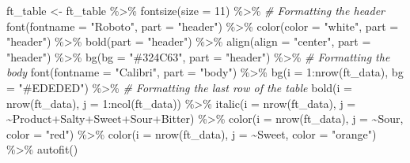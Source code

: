 \documentclass[
]{krantz}
\makeatletter
\newenvironment{Shaded}{\begin{snugshade}}{\end{snugshade}}
\newcommand{\AttributeTok}[1]{\textcolor[rgb]{0.61,0.61,0.61}{#1}}
\newcommand{\CommentTok}[1]{\textcolor[rgb]{0.37,0.37,0.37}{\textit{#1}}}
\newcommand{\DecValTok}[1]{\textcolor[rgb]{0.06,0.06,0.06}{#1}}
\newcommand{\FunctionTok}[1]{\textcolor[rgb]{0,0,0}{#1}}
\newcommand{\NormalTok}[1]{#1}
\newcommand{\OtherTok}[1]{\textcolor[rgb]{0.37,0.37,0.37}{#1}}
\newcommand{\SpecialCharTok}[1]{\textcolor[rgb]{0,0,0}{#1}}
\newcommand{\StringTok}[1]{\textcolor[rgb]{0.5,0.5,0.5}{#1}}
\newenvironment{kframe}{%
\medskip{}
\setlength{\fboxsep}{.8em}
 \def\at@end@of@kframe{}%
 \ifinner\ifhmode%
  \def\at@end@of@kframe{\end{minipage}}%
  \begin{minipage}{\columnwidth}%
 \fi\fi%
 \def\FrameCommand##1{\hskip\@totalleftmargin \hskip-\fboxsep
 \colorbox{shadecolor}{##1}\hskip-\fboxsep
     \hskip-\linewidth \hskip-\@totalleftmargin \hskip\columnwidth}%
 \MakeFramed {\advance\hsize-\width
   \@totalleftmargin\z@ \linewidth\hsize
   \@setminipage}}%
 {\par\unskip\endMakeFramed%
 \at@end@of@kframe}
\renewenvironment{Shaded}{\begin{kframe}}{\end{kframe}}
\makeatother
\begin{document}
\begin{Shaded}
\begin{Highlighting}[]
\NormalTok{ft\_table }\OtherTok{\textless{}{-}}\NormalTok{ ft\_table }\SpecialCharTok{\%\textgreater{}\%} 
  \FunctionTok{fontsize}\NormalTok{(}\AttributeTok{size =} \DecValTok{11}\NormalTok{) }\SpecialCharTok{\%\textgreater{}\%}
  \CommentTok{\# Formatting the header}
  \FunctionTok{font}\NormalTok{(}\AttributeTok{fontname =} \StringTok{"Roboto"}\NormalTok{, }\AttributeTok{part =} \StringTok{"header"}\NormalTok{) }\SpecialCharTok{\%\textgreater{}\%}
  \FunctionTok{color}\NormalTok{(}\AttributeTok{color =} \StringTok{"white"}\NormalTok{, }\AttributeTok{part =} \StringTok{"header"}\NormalTok{) }\SpecialCharTok{\%\textgreater{}\%}
  \FunctionTok{bold}\NormalTok{(}\AttributeTok{part =} \StringTok{"header"}\NormalTok{) }\SpecialCharTok{\%\textgreater{}\%}
  \FunctionTok{align}\NormalTok{(}\AttributeTok{align =} \StringTok{"center"}\NormalTok{, }\AttributeTok{part =} \StringTok{"header"}\NormalTok{) }\SpecialCharTok{\%\textgreater{}\%}
  \FunctionTok{bg}\NormalTok{(}\AttributeTok{bg =} \StringTok{"\#324C63"}\NormalTok{, }\AttributeTok{part =} \StringTok{"header"}\NormalTok{) }\SpecialCharTok{\%\textgreater{}\%}
  \CommentTok{\# Formatting the body}
  \FunctionTok{font}\NormalTok{(}\AttributeTok{fontname =} \StringTok{"Calibri"}\NormalTok{, }\AttributeTok{part =} \StringTok{"body"}\NormalTok{) }\SpecialCharTok{\%\textgreater{}\%} 
  \FunctionTok{bg}\NormalTok{(}\AttributeTok{i =} \DecValTok{1}\SpecialCharTok{:}\FunctionTok{nrow}\NormalTok{(ft\_data), }\AttributeTok{bg =} \StringTok{"\#EDEDED"}\NormalTok{) }\SpecialCharTok{\%\textgreater{}\%} 
  \CommentTok{\# Formatting the last row of the table}
  \FunctionTok{bold}\NormalTok{(}\AttributeTok{i =} \FunctionTok{nrow}\NormalTok{(ft\_data), }\AttributeTok{j =} \DecValTok{1}\SpecialCharTok{:}\FunctionTok{ncol}\NormalTok{(ft\_data)) }\SpecialCharTok{\%\textgreater{}\%} 
  \FunctionTok{italic}\NormalTok{(}\AttributeTok{i =} \FunctionTok{nrow}\NormalTok{(ft\_data), }\AttributeTok{j =} \SpecialCharTok{\textasciitilde{}}\NormalTok{Product}\SpecialCharTok{+}\NormalTok{Salty}\SpecialCharTok{+}\NormalTok{Sweet}\SpecialCharTok{+}\NormalTok{Sour}\SpecialCharTok{+}\NormalTok{Bitter) }\SpecialCharTok{\%\textgreater{}\%}
  \FunctionTok{color}\NormalTok{(}\AttributeTok{i =}  \FunctionTok{nrow}\NormalTok{(ft\_data), }\AttributeTok{j =} \SpecialCharTok{\textasciitilde{}}\NormalTok{Sour, }\AttributeTok{color =} \StringTok{"red"}\NormalTok{) }\SpecialCharTok{\%\textgreater{}\%}
  \FunctionTok{color}\NormalTok{(}\AttributeTok{i =}  \FunctionTok{nrow}\NormalTok{(ft\_data), }\AttributeTok{j =} \SpecialCharTok{\textasciitilde{}}\NormalTok{Sweet, }\AttributeTok{color =} \StringTok{"orange"}\NormalTok{) }\SpecialCharTok{\%\textgreater{}\%} 
  \FunctionTok{autofit}\NormalTok{()}


\end{Highlighting}
\end{Shaded}
\end{document}
